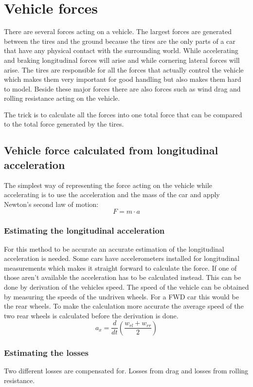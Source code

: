 \section{Vehicle forces}
There are several forces acting on a vehicle. The largest forces are generated between the tires and the ground because the tires are the only parts of a car that have any physical contact with the surrounding world. While accelerating and braking longitudinal forces will arise and while cornering lateral forces will arise. The tires are responsible for all the forces that actually control the vehicle which makes them very important for good handling but also makes them hard to model. Beside these major forces there are also forces such as wind drag and rolling resistance acting on the vehicle.

The trick is to calculate all the forces into one total force that can be compared to the total force generated by the tires.
\subsection{Vehicle force calculated from longitudinal acceleration}
The simplest way of representing the force acting on the vehicle while accelerating is to use the acceleration and the mass of the car and apply Newton's second law of motion:
\begin{equation}
	F = m \cdot a
\end{equation}
\subsubsection{Estimating the longitudinal acceleration}
\label{longaccest}
For this method to be accurate an accurate estimation of the longitudinal acceleration is needed. Some cars have accelerometers installed for longitudinal measurements which makes it straight forward to calculate the force. If one of those aren't available the acceleration has to be calculated instead. This can be done by derivation of the vehicles speed. The speed of the vehicle can be obtained by measuring the speeds of the undriven wheels. For a FWD car this would be the rear wheels. To make the calculation more accurate the average speed of the two rear wheels is calculated before the derivation is done.
\begin{equation}
a_{x} = \frac{d}{dt}(\frac{w_{rl}+w_{rr}}{2})
\end{equation}

\subsubsection{Estimating the losses}
Two different losses are compensated for. Losses from drag and losses from rolling resistance.

